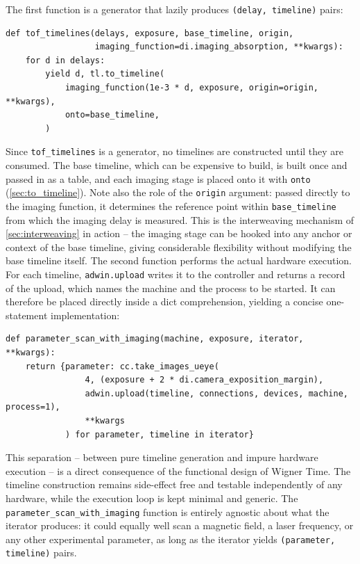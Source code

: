 \documentclass{SciPost}
\newcommand{\python}[1]{%
  \texttt{#1}%
}
\begin{document}
\begin{appendix}
The first function is a generator that lazily produces \python{(delay, timeline)} pairs:
%
\begin{verbatim}
def tof_timelines(delays, exposure, base_timeline, origin,
                  imaging_function=di.imaging_absorption, **kwargs):
    for d in delays:
        yield d, tl.to_timeline(
            imaging_function(1e-3 * d, exposure, origin=origin, **kwargs),
            onto=base_timeline,
        )
\end{verbatim}
%
Since \python{tof_timelines} is a generator, no timelines are constructed until they are consumed. The base timeline, which can be expensive to build, is built once and passed in as a table, and each imaging stage is placed onto it with \python{onto} (\cref{sec:to_timeline}). Note also the role of the \python{origin} argument: passed directly to the imaging function, it determines the reference point within \python{base_timeline} from which the imaging delay is measured. This is the interweaving mechanism of \cref{sec:interweaving} in action – the imaging stage can be hooked into any anchor or context of the base timeline, giving considerable flexibility without modifying the base timeline itself. The second function performs the actual hardware execution. For each timeline, \python{adwin.upload} writes it to the controller and returns a record of the upload, which names the machine and the process to be started. It can therefore be placed directly inside a dict comprehension, yielding a concise one-statement implementation:
%
\begin{verbatim}
def parameter_scan_with_imaging(machine, exposure, iterator, **kwargs):
    return {parameter: cc.take_images_ueye(
                4, (exposure + 2 * di.camera_exposition_margin),
                adwin.upload(timeline, connections, devices, machine, process=1),
                **kwargs
            ) for parameter, timeline in iterator}
\end{verbatim}
%
This separation – between pure timeline generation and impure hardware execution – is a direct consequence of the functional design of Wigner Time. The timeline construction remains side-effect free and testable independently of any hardware, while the execution loop is kept minimal and generic. The \python{parameter_scan_with_imaging} function is entirely agnostic about what the iterator produces: it could equally well scan a magnetic field, a laser frequency, or any other experimental parameter, as long as the iterator yields \python{(parameter, timeline)} pairs.
 

\end{appendix}
\end{document}
